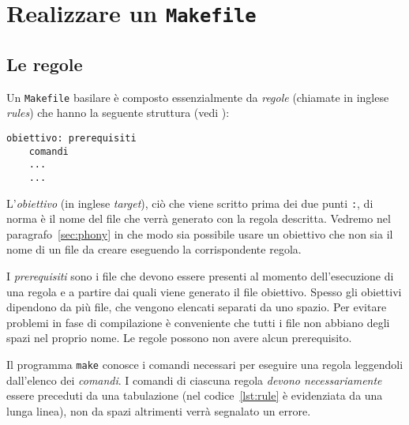 \cleardoublepage
\chapter{Realizzare un \texttt{Makefile}}
\label{cha:realizzare-makefile}

\section{Le regole}
\label{sec:le-regole}

Un \verb|Makefile| basilare è composto essenzialmente da \emph{regole} (chiamate
in inglese \emph{rules}) che hanno la seguente struttura (vedi
\textcite[3]{gnu:make}):
\begin{lstlisting}[showtabs=true,tab=\rightarrowfill,caption={Struttura di una
regola},label=lst:rule]
obiettivo: prerequisiti
	comandi
	...
	...
\end{lstlisting}
L'\emph{obiettivo} (in inglese \emph{target}), ciò che viene scritto prima dei
due punti \verb|:|, di norma è il nome del file che verrà generato con la regola
descritta.  Vedremo nel paragrafo~\ref{sec:phony} in che modo sia possibile
usare un obiettivo che non sia il nome di un file da creare eseguendo la
corrispondente regola.

I \emph{prerequisiti} sono i file che devono essere presenti al momento
dell'esecuzione di una regola e a partire dai quali viene generato il file
obiettivo.  Spesso gli obiettivi dipendono da più file, che vengono elencati
separati da uno spazio.  Per evitare problemi in fase di compilazione è
conveniente che tutti i file non abbiano degli spazi nel proprio nome.  Le
regole possono non avere alcun prerequisito.

Il programma \verb|make| conosce i comandi necessari per eseguire una regola
leggendoli dall'elenco dei \emph{comandi}.  I comandi di ciascuna regola
\emph{devono necessariamente} essere preceduti da una tabulazione (nel
codice~\ref{lst:rule} è evidenziata da una lunga linea), non da spazi altrimenti
verrà segnalato un errore.


